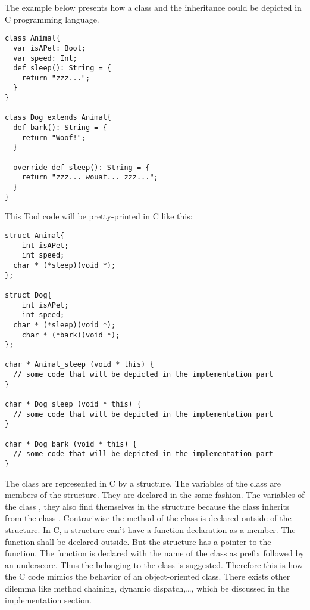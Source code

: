 The example below presents how a class and the inheritance could be depicted in C programming language.
\lstset{style=customtool}
\begin{lstlisting}
class Animal{
  var isAPet: Bool;
  var speed: Int;
  def sleep(): String = {
    return "zzz...";
  }
}

class Dog extends Animal{
  def bark(): String = {
    return "Woof!";
  }

  override def sleep(): String = {
    return "zzz... wouaf... zzz...";
  }
}
\end{lstlisting}
This Tool code will be pretty-printed in C like this:
\lstset{style=customc}
\begin{lstlisting}
struct Animal{
	int isAPet;
	int speed;
  char * (*sleep)(void *);
};

struct Dog{
	int isAPet;
	int speed;
  char * (*sleep)(void *);
	char * (*bark)(void *);
};

char * Animal_sleep (void * this) {
  // some code that will be depicted in the implementation part
}

char * Dog_sleep (void * this) {
  // some code that will be depicted in the implementation part
}

char * Dog_bark (void * this) {
  // some code that will be depicted in the implementation part
}
\end{lstlisting}
The class are represented in C by a structure. The variables of the class
are members of the structure. They are declared in the same fashion.
\newline
The variables of the class , they also find themselves in the  structure
because the class  inherits from the class .
\newline
Contrariwise the method of the class is declared outside of the structure.
In C, a structure can't have a function declaration as a member. The function shall
be declared outside. But the structure has a pointer to the function.
\newline
The function is declared with the name of the class as prefix followed by an underscore.
Thus the belonging to the  class is suggested.
\newline
Therefore this is how the C code mimics the behavior of an object-oriented class.
\newline
There exists other dilemma like method chaining, dynamic dispatch,\ldots, which be discussed
in the implementation section.
\newline
